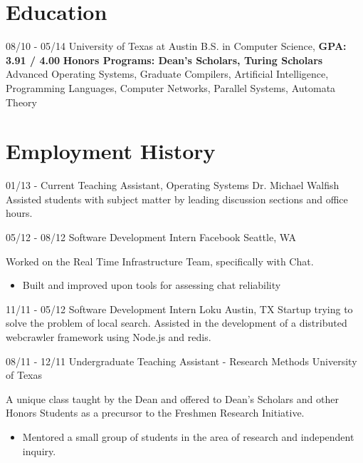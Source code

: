 \documentclass[11pt,letter,sans]{moderncv}
\begin{document}
\maketitle

\section{Education}
\cventry
{08/10 - 05/14}
{University of Texas at Austin}
{B.S. in Computer Science, \textbf{GPA: 3.91 / 4.00}}
{}
{}
{\textbf{Honors Programs: Dean's Scholars, Turing Scholars}}
{Advanced Operating Systems, Graduate Compilers, Artificial Intelligence,
Programming Languages, Computer Networks, Parallel Systems, Automata Theory}

\section{Employment History}
\cventry
{01/13 - Current}
{Teaching Assistant, Operating Systems}
{Dr. Michael Walfish}
{}
{}
{Assisted students with subject matter by leading discussion sections and
office hours.}

\cventry
{05/12 - 08/12}
{Software Development Intern}
{Facebook}
{Seattle, WA}
{}
{Worked on the Real Time Infrastructure Team, specifically with Chat.
  \begin{itemize}
    \item Built and improved upon tools for assessing chat reliability
\end{itemize}}

\cventry
{11/11 - 05/12}
{Software Development Intern}
{Loku}
{Austin, TX}
{}
{Startup trying to solve the problem of local search. Assisted in the
development of a distributed webcrawler framework using Node.js and redis.}

\cventry
{08/11 - 12/11}
{Undergraduate Teaching Assistant - Research Methods}
{University of Texas}
{}
{}
{A unique class taught by the Dean and offered to Dean's Scholars and other
  Honors Students as a precursor to the Freshmen Research Initiative.
  \begin{itemize}
    \item Mentored a small group of students in the area of research and
      independent inquiry.
\end{itemize}}
\end{document}
